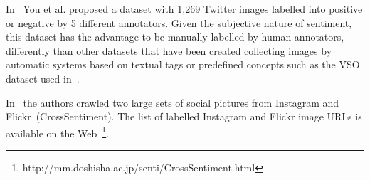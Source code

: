 In~\cite{you2015robust} You et al. proposed a dataset with 1,269 Twitter images labelled into positive or negative by 5 different annotators. Given the subjective nature of sentiment, this dataset has the advantage to be manually labelled by human annotators, differently than other datasets that have been created collecting images by automatic systems based on textual tags or predefined concepts such as the VSO dataset used in~\cite{borth2013large}. %

In~\cite{katsurai2016image} the authors crawled two large sets of social pictures from Instagram and Flickr~(CrossSentiment). The list of labelled Instagram and Flickr image URLs is available on the Web~\footnote{http://mm.doshisha.ac.jp/senti/CrossSentiment.html}.


